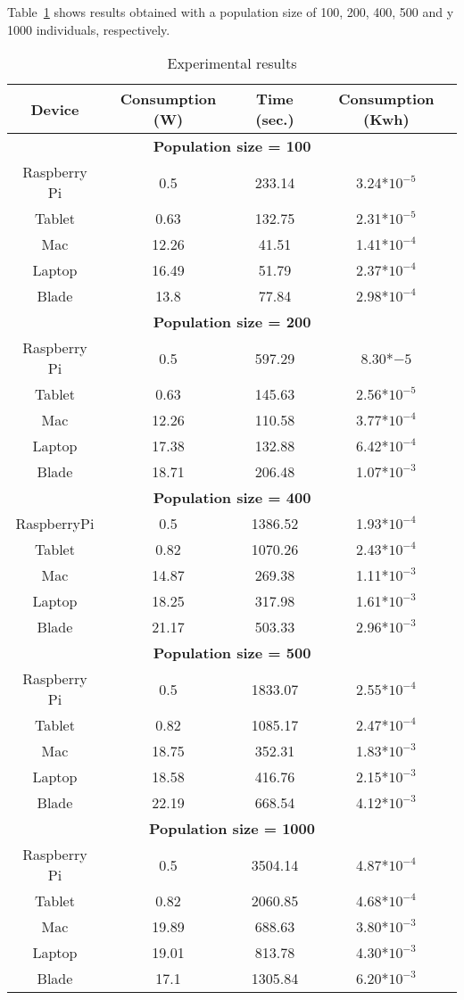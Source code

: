 Table~\ref{Table:result_todos} shows results obtained with a population size of 100, 200, 400, 500 and y 1000 individuals, respectively. 
\begin{small}
 
\begin{table}[!ht]
\renewcommand{\arraystretch}{1.3}
\centering
\caption{Experimental results}
\label{Table:result_todos}
\begin{tabular}{cccc} \hline
Device & Consumption (W) & Time (sec.) & Consumption (Kwh) \\ \hline
\multicolumn{4}{c}{\textbf{Population size = 100}}\\ %
Raspberry Pi & 0.5 & 233.14 & 3.24*$10^{-5}$ \\
Tablet & 0.63 & 132.75 & 2.31*$10^{-5}$ \\
Mac & 12.26 & 41.51 & 1.41*$10^{-4}$ \\
Laptop & 16.49 & 51.79 & 2.37*$10^{-4}$ \\
Blade & 13.8 & 77.84 & 2.98*$10^{-4}$ \\ \hline
\multicolumn{4}{c}{\textbf{Population size = 200}}\\ %
Raspberry Pi &	0.5 &	597.29 & 8.30*${-5}$ \\
Tablet & 0.63 & 145.63 & 2.56*$10^{-5}$ \\
Mac & 12.26 & 110.58 & 3.77*$10^{-4}$ \\
Laptop	& 17.38 & 132.88 & 6.42*$10^{-4}$ \\
Blade & 18.71 & 206.48 & 1.07*$10^{-3}$ \\ \hline
\multicolumn{4}{c}{\textbf{Population size = 400}}\\ %
 RaspberryPi&0.5&1386.52&1.93*$10^{-4}$ \\
Tablet &0.82&1070.26&2.43*$10^{-4}$\\
Mac&14.87&269.38&1.11*$10^{-3}$\\
Laptop&18.25&317.98&1.61*$10^{-3}$\\
Blade&21.17&503.33&2.96*$10^{-3}$ \\ \hline
\multicolumn{4}{c}{\textbf{Population size = 500}}\\ %
Raspberry Pi & 0.5&1833.07&2.55*$10^{-4}$ \\
Tablet & 0.82 & 1085.17& 2.47*$10^{-4}$ \\
Mac & 18.75 & 352.31 & 1.83*$10^{-3}$ \\
Laptop & 18.58 & 416.76 & 2.15*$10^{-3}$ \\
Blade & 22.19 & 668.54 & 4.12*$10^{-3}$ \\ \hline
\multicolumn{4}{c}{\textbf{Population size = 1000}}\\ %
Raspberry Pi&0.5&3504.14&4.87*$10^{-4}$ \\
Tablet & 0.82 & 2060.85 &4.68*$10^{-4}$ \\
Mac &19.89 & 688.63 &3.80*$10^{-3}$ \\
Laptop &19.01&813.78&4.30*$10^{-3}$ \\
Blade &	17.1&1305.84&6.20*$10^{-3}$ \\ \hline

\end{tabular}
\end{table} 
\end{small}

